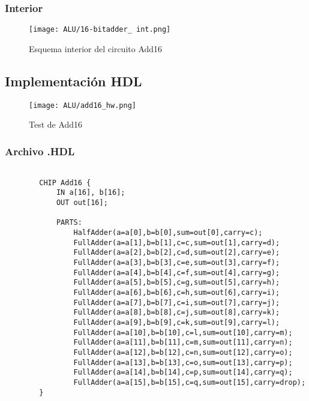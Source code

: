 \documentclass[12pt]{article}
\begin{document}
        \subsubsection{Interior} 
        \begin{figure}[H]
            \centering
            \texttt{[image: ALU/16-bitadder\_ int.png]}
            \caption{Esquema interior del circuito Add16}
            \label{fig:f_add16}
        \end{figure}
    \subsection{Implementación HDL}
    \begin{figure}[H]
        \centering
        \texttt{[image: ALU/add16\_hw.png]}
        \caption{Test de Add16}
        \label{fig:enter-label}
    \end{figure}
    \newpage
        \subsubsection{Archivo .HDL}
            \begin{lstlisting}
                
        CHIP Add16 {
            IN a[16], b[16];
            OUT out[16];
        
            PARTS:	
                HalfAdder(a=a[0],b=b[0],sum=out[0],carry=c);
                FullAdder(a=a[1],b=b[1],c=c,sum=out[1],carry=d);
                FullAdder(a=a[2],b=b[2],c=d,sum=out[2],carry=e);
                FullAdder(a=a[3],b=b[3],c=e,sum=out[3],carry=f);
                FullAdder(a=a[4],b=b[4],c=f,sum=out[4],carry=g);
                FullAdder(a=a[5],b=b[5],c=g,sum=out[5],carry=h);
                FullAdder(a=a[6],b=b[6],c=h,sum=out[6],carry=i);
                FullAdder(a=a[7],b=b[7],c=i,sum=out[7],carry=j);
                FullAdder(a=a[8],b=b[8],c=j,sum=out[8],carry=k);
                FullAdder(a=a[9],b=b[9],c=k,sum=out[9],carry=l);
                FullAdder(a=a[10],b=b[10],c=l,sum=out[10],carry=m);
                FullAdder(a=a[11],b=b[11],c=m,sum=out[11],carry=n);
                FullAdder(a=a[12],b=b[12],c=n,sum=out[12],carry=o);
                FullAdder(a=a[13],b=b[13],c=o,sum=out[13],carry=p);
                FullAdder(a=a[14],b=b[14],c=p,sum=out[14],carry=q);
                FullAdder(a=a[15],b=b[15],c=q,sum=out[15],carry=drop);
        }
            \end{lstlisting}
\end{document}
